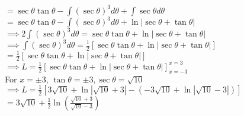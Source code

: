 \documentclass{article}
\begin{document}
{    $
    = \sec{\theta}\tan{\theta}
    - \int{(\sec{\theta})^3} d{\theta} 
    + \int{\sec{\theta}} d\theta
    $\\

    $
    = \sec{\theta}\tan{\theta}
    - \int{(\sec{\theta})^3} d{\theta} 
    + \ln|\sec{\theta} + \tan{\theta}|
    $\\

    $
    \implies 2\int{(\sec{\theta})^3}d{\theta}
    = \sec{\theta}\tan{\theta}
    + \ln|\sec{\theta} + \tan{\theta}|
    $\\
    
    $
    \implies \int{(\sec{\theta})^3}d{\theta}
    = \frac{1}{2}[
        \sec{\theta}\tan{\theta}
        + \ln|\sec{\theta} + \tan{\theta}|
        ]
    $\\
    
    
    $
    = \frac{1}{2}[
        \sec{\theta}\tan{\theta}
        + \ln|\sec{\theta} + \tan{\theta}|
        ]
        $\\

    $ \implies L 
    = \frac{1}{2} \left[
        \sec{\theta}\tan{\theta}
        + \ln|\sec{\theta} + \tan{\theta}|
    \right]_{x=-3}^{x=3}
    $\\

    For $ x=\pm{3} $, $\tan{\theta}=\pm{3}, \sec{\theta}=\sqrt{10}$\\
    
    $ \implies L 
    = \frac{1}{2} \left[
        3\sqrt{10} + \ln|\sqrt{10} + 3|
        -(-3\sqrt{10} + \ln|\sqrt{10} - 3|)
    \right]$\\

    $
    = 3\sqrt{10} +  \frac{1}{2}\ln(\frac{\sqrt{10} + 3}{\sqrt{10} - 3})
    $\\

    }
\end{document}
